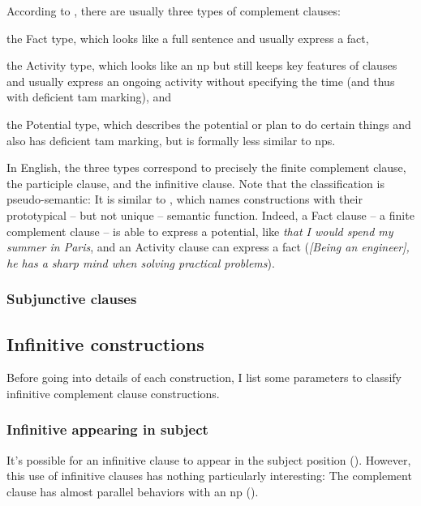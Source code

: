 \documentclass[UTF8, a4paper, oneside, scheme=plain]{ctexrep}
\newcommand*{\citesec}[1]{\S~{#1}}
\newcommand{\corpus}[1]{\emph{#1}}
\begin{document}
According to \citet[\citesec{18.4}]{dixon2010basic2},
there are usually three types of complement clauses:
\begin{enumerate*}
    \item the Fact type, which looks like a full sentence
    and usually express a fact, 
    \item the Activity type, which looks like an \acs{np}
    but still keeps key features of clauses 
    and usually express an ongoing activity 
    without specifying the time (and thus with deficient \acs{tam} marking), and 
    \item the Potential type,
    which describes the potential or plan to do certain things 
    and also has deficient \acs{tam} marking,
    but is formally less similar to \acs{np}s.
\end{enumerate*}
In English, the three types correspond to precisely 
the finite complement clause,
the participle clause,
and the infinitive clause.
Note that the classification is pseudo-semantic:
It is similar to ,
which names constructions with their prototypical -- but not unique -- semantic function.
Indeed, a Fact clause -- a finite complement clause -- 
is able to express a potential,
like \corpus{that I would spend my summer in Paris},
and an Activity clause can express a fact 
(\corpus{[Being an engineer], he has a sharp mind when solving practical problems}).

\subsubsection{Subjunctive clauses}\label{sec:complement.subjunctive}

\subsection{Infinitive constructions}

Before going into details of each construction,
I list some parameters to classify infinitive complement clause constructions.

\subsubsection{Infinitive appearing in subject}

It's possible for an infinitive clause to appear in the subject position
().
However, this use of infinitive clauses 
has nothing particularly interesting:
The complement clause has almost parallel behaviors with an \acs{np} 
().
\end{document}
